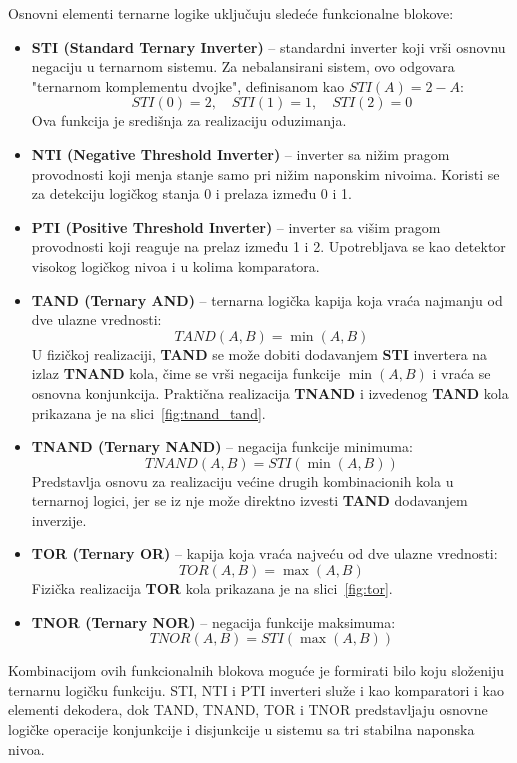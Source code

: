 \documentclass[conference,a4paper]{IEEEtran}
\begin{document}
	Osnovni elementi ternarne logike uključuju sledeće funkcionalne blokove:
	
	\begin{itemize}
		\item \textbf{STI (Standard Ternary Inverter)} – standardni inverter koji vrši osnovnu negaciju u ternarnom sistemu. Za nebalansirani sistem, ovo odgovara "ternarnom komplementu dvojke", definisanom kao $STI(A) = 2 - A$:
		\[
		STI(0)=2, \quad STI(1)=1, \quad STI(2)=0
		\]
		Ova funkcija je središnja za realizaciju oduzimanja.
		
		\item \textbf{NTI (Negative Threshold Inverter)} – inverter sa nižim pragom provodnosti koji menja stanje samo pri nižim naponskim nivoima. Koristi se za detekciju logičkog stanja 0 i prelaza između 0 i 1.
		
		\item \textbf{PTI (Positive Threshold Inverter)} – inverter sa višim pragom provodnosti koji reaguje na prelaz između 1 i 2. Upotrebljava se kao detektor visokog logičkog nivoa i u kolima komparatora.
		
		\item \textbf{TAND (Ternary AND)} – ternarna logička kapija koja vraća najmanju od dve ulazne vrednosti:
		\[
		TAND(A,B) = \min(A,B)
		\]
		U fizičkoj realizaciji, \textbf{TAND} se može dobiti dodavanjem \textbf{STI} invertera na izlaz \textbf{TNAND} kola, čime se vrši negacija funkcije $\min(A,B)$ i vraća se osnovna konjunkcija.  
		Praktična realizacija \textbf{TNAND} i izvedenog \textbf{TAND} kola prikazana je na slici~\ref{fig:tnand_tand}.
		
		\item \textbf{TNAND (Ternary NAND)} – negacija funkcije minimuma:
		\[
		TNAND(A,B) = STI(\min(A,B))
		\]
		Predstavlja osnovu za realizaciju većine drugih kombinacionih kola u ternarnoj logici, jer se iz nje može direktno izvesti \textbf{TAND} dodavanjem inverzije.
		
		\item \textbf{TOR (Ternary OR)} – kapija koja vraća najveću od dve ulazne vrednosti:
		\[
		TOR(A,B) = \max(A,B)
		\]
		Fizička realizacija \textbf{TOR} kola prikazana je na slici~\ref{fig:tor}.
		
		\item \textbf{TNOR (Ternary NOR)} – negacija funkcije maksimuma:
		\[
		TNOR(A,B) = STI(\max(A,B))
		\]
	\end{itemize}
	
	Kombinacijom ovih funkcionalnih blokova moguće je formirati bilo koju složeniju ternarnu logičku funkciju.  
	STI, NTI i PTI inverteri služe i kao komparatori i kao elementi dekodera, dok TAND, TNAND, TOR i TNOR predstavljaju osnovne logičke operacije konjunkcije i disjunkcije u sistemu sa tri stabilna naponska nivoa.
	
\end{document}
